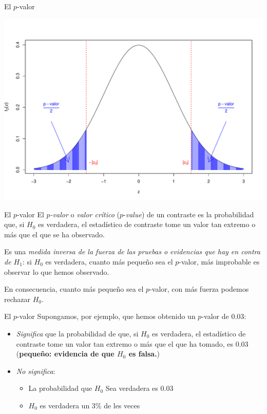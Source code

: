 \documentclass[
  ignorenonframetext,
]{beamer}
\begin{document}
\begin{frame}{El \(p\)-valor}
\protect\hypertarget{el-p-valor-5}{}
\begin{center}\includegraphics{contrastes_dos_muestras_files/figure-beamer/unnamed-chunk-6-1} \end{center}
\end{frame}

\begin{frame}{El \(p\)-valor}
\protect\hypertarget{el-p-valor-6}{}
El \emph{\(p\)-valor} o \emph{valor crítico} (\(p\)-\emph{value}) de un
contraste es la probabilidad que, si \(H_0\) es verdadera, el
estadístico de contraste tome un valor tan extremo o más que el que se
ha observado.

Es una \emph{medida inversa de la fuerza de las pruebas o evidencias que
hay en contra de \(H_1\)}: si \(H_0\) es verdadera, cuanto más pequeño
sea el \(p\)-valor, más improbable es observar lo que hemos observado.

En consecuencia, cuanto más pequeño sea el \(p\)-valor, con más fuerza
podemos rechazar \(H_0\).
\end{frame}

\begin{frame}{El \(p\)-valor}
\protect\hypertarget{el-p-valor-7}{}
Supongamos, por ejemplo, que hemos obtenido un \(p\)-valor de \(0.03\):

\begin{itemize}[<+->]
\item
  \emph{Significa} que la probabilidad de que, si \(H_0\) es verdadera,
  el estadístico de contraste tome un valor tan extremo o más que el que
  ha tomado, es 0.03 (\textbf{pequeño: evidencia de que \(H_0\) es
  falsa.})
\item
  \emph{No significa}:

  \begin{itemize}[<+->]
  \item
    La probabilidad que \(H_0\) Sea verdadera es \(0.03\)
  \item
    \(H_0\) es verdadera un 3\% de les veces
  \end{itemize}
\end{itemize}
\end{frame}
\end{document}

